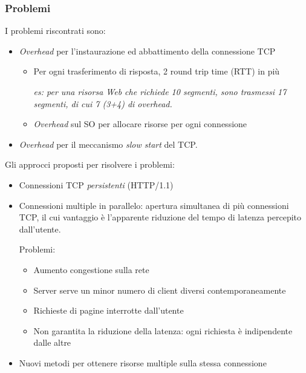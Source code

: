 \documentclass[a4paper,11pt]{article}
\begin{document}
\subsubsection{Problemi}
I problemi riscontrati sono:
\begin{itemize}
    \item \textit{Overhead} per l’instaurazione ed abbattimento della connessione TCP
    \begin{itemize}
        \item Per ogni trasferimento di risposta, 2 round trip time (RTT) in più
        \setlength\parindent{2em}\par
        \emph{es: per una risorsa Web che richiede 10 segmenti, sono trasmessi 17 segmenti, di cui 7 (3+4) di overhead.}
        \item \textit{Overhead} sul SO per allocare risorse per ogni connessione
    \end{itemize}
    \item \textit{Overhead} per il meccanismo \textit{slow start} del TCP.
    \setlength\parindent{2em}\par
\end{itemize}
Gli approcci proposti per risolvere i problemi:
\begin{itemize}
    \item Connessioni TCP \textit{persistenti} (HTTP/1.1)
    \item Connessioni multiple in parallelo: apertura simultanea di più connessioni TCP, il cui vantaggio è l’apparente riduzione del tempo di latenza percepito dall’utente.\par
    Problemi:
    \begin{itemize}
        \item Aumento congestione sulla rete
        \item Server serve un minor numero di client diversi contemporaneamente
        \item Richieste di pagine interrotte dall’utente
        \item Non garantita la riduzione della latenza: ogni richiesta è indipendente dalle altre
    \end{itemize}
    \item Nuovi metodi per ottenere risorse multiple sulla stessa connessione
\end{itemize}
\end{document}
